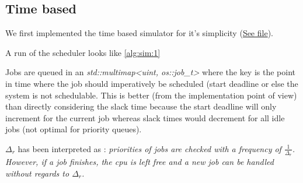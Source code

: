 \subsection{Time based}

We first implemented the time based simulator for it's simplicity (\href{../h/os/llf_scheduler_time_based.h}{See file}).

A run of the scheduler looks like \ref{alg:sim:1}


Jobs are queued in an \emph{std::multimap<uint, os::job\_t>} where the key is the point in time where the job should imperatively be scheduled (start deadline or else the system is not schedulable.
This is better (from the implementation point of view) than directly considering the slack time because the start deadline will only increment for the current job whereas slack times would decrement for all idle jobs (not optimal for priority queues).

$\Delta_r$ has been interpreted as : \emph{priorities of jobs are checked with a frequency of $\frac{1}{\Delta_r}$. However, if a job finishes, the cpu is left free and a new job can be handled without regards to $\Delta_r$.}